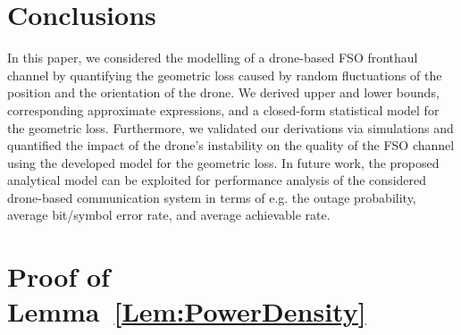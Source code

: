 \documentclass[conference]{IEEEtran}
\begin{document}
\section{Conclusions}

In this paper, we considered the modelling of a drone-based FSO fronthaul channel by quantifying the geometric loss caused by random fluctuations of the position and the orientation of the drone. We derived upper and lower bounds, corresponding approximate expressions, and a closed-form statistical model for the geometric loss. Furthermore, we validated our derivations via simulations and quantified the impact of the drone's instability on the quality of the FSO channel using the developed model for the geometric loss. In future work, the proposed analytical model can be exploited for performance analysis of the considered drone-based communication system in terms of e.g. the outage probability, average bit/symbol error rate, and average achievable rate.

\appendices
\section{Proof of Lemma~\ref{Lem:PowerDensity}}\label{App:Lem_PowerDensity}
\end{document}

